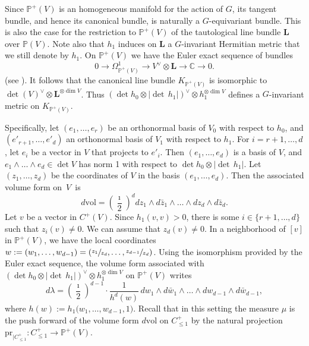\documentclass[10pt]{amsart}
\theoremstyle{plain}
\theoremstyle{definition}
\def\C{\mathbb{C}}
\newcommand{\Pb}{\mathbb{P}}
\newcommand{\Lb}{\mathbf{L}}
\newcommand{\vol}{\mathrm{vol}}
\newcommand{\pr}{\mathrm{pr}}
\begin{document}
Since $\Pb^+(V)$ is an homogeneous manifold for the action of $G$, its tangent bundle, and hence its canonical bundle, is naturally a $G$-equivariant bundle. This is also the case for the restriction to $\Pb^+(V)$ of the tautological line bundle $\Lb$ over $\Pb(V)$.
Note also that $h_1$ induces on $\Lb$ a $G$-invariant Hermitian metric that we still denote by $h_1$.
On $\Pb^+(V)$ we have the Euler exact sequence of bundles
\[
0\to \Omega^1_{\Pb^+(V)}\to V^\vee\otimes \Lb\to \C \to 0.
\]
(see \cite[Th.\,II.8.13]{Hart}). It follows that the canonical line bundle $K_{\Pb^+(V)}$ is isomorphic to $\det(V)^\vee\otimes \Lb^{\otimes\dim V}$. Thus $(\det h_0 \otimes |{\det\,} h_1| )^\vee \otimes h_1^{\otimes \dim V }$ defines a $G$-invariant metric on $K_{\Pb^+(V)}$.

Specifically, let $(e_1,\dots,e_r)$ be an orthonormal basis of $V_0$ with respect to $h_0$, and $(e'_{r+1},\dots,e'_d)$ an orthonormal basis of $V_1$ with respect to $h_1$. For $i=r+1,\dots,d$, let $e_i$ be a vector in $V$ that projects to $e'_i$.
Then $(e_1,\dots,e_d)$ is a basis of $V$, and $e_1\wedge\dots\wedge e_d \in \det V$ has norm 1 with respect to $\det h_0 \otimes |{\det\,} h_1|$.
Let $(z_1,\dots,z_d)$ be the coordinates of $V$ in the basis $(e_1,\dots,e_d)$.
Then the associated volume form on~$V$~is
\[
d\vol=\left(\frac{\imath}{2}\right)^{d} dz_1\wedge d\bar{z}_1\wedge\dots\wedge dz_{d}\wedge d\bar{z}_{d}.
\]
Let $v$ be a vector in $C^+(V)$. Since $h_1(v,v)>0$, there is some $i\in \{r+1,\dots,d\}$ such that $z_i(v)\not=0$.
We can assume that $z_d(v)\neq 0$.
In a neighborhood of $[v]$ in $\Pb^+(V)$, we have the local coordinates $w:=(w_1,\dots,w_{d-1})=(\sfrac{z_1}{z_d},\dots,\sfrac{z_{d-1}}{z_d})$. Using the isomorphism provided by the Euler exact sequence, the volume form associated with $(\det h_0 \otimes |{\det\,} h_1| )^\vee \otimes h_1^{\otimes \dim V}$ on $\Pb^+(V)$ writes
\[
d\lambda= \left(\frac{\imath}{2}\right)^{d-1}\cdot\frac{1}{h^d(w)}\, dw_1\wedge d\bar{w}_1\wedge \dots \wedge dw_{d-1}\wedge d\bar{w}_{d-1},
\]
where $h(w):=h_1\bigl(w_1,\dots,w_{d-1},1\bigr)$.
Recall that in this setting the measure $\mu$ is the push forward of the volume form $d\vol$ on $C^+_{\leq 1}$ by the natural projection $\pr_{|C^+_{\leq 1}}: C^+_{\leq 1} \to \Pb^+(V)$.
\end{document}
